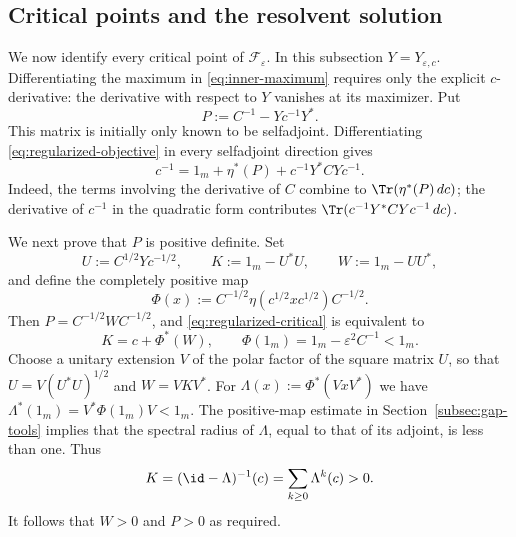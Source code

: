 \subsection{Critical points and the resolvent solution}
We now identify every critical point of $\mathcal F_\varepsilon$.
In this subsection $Y=Y_{\varepsilon,c}$.
Differentiating the maximum in \eqref{eq:inner-maximum} requires only the explicit $c$-derivative: the derivative with respect to $Y$ vanishes at its maximizer.
Put
\begin{equation}\label{eq:auxiliary-P}
 P:=C^{-1}-Yc^{-1}Y^*.
\end{equation}
This matrix is initially only known to be selfadjoint.
Differentiating \eqref{eq:regularized-objective} in every selfadjoint direction gives
\begin{equation}\label{eq:regularized-critical}
 c^{-1}=1_m+\eta^*(P)+c^{-1}Y^*CYc^{-1}.
\end{equation}
Indeed, the terms involving the derivative of $C$ combine to $\Tr(\eta^*(P)\,dc)$; the derivative of $c^{-1}$ in the quadratic form contributes $\Tr(c^{-1}Y^*CYc^{-1}\,dc)$.

We next prove that $P$ is positive definite.
Set
\[
 U:=C^{1/2}Yc^{-1/2},\qquad K:=1_m-U^*U,\qquad W:=1_m-UU^*,
\]
and define the completely positive map
\[
 \Phi(x):=C^{-1/2}\eta(c^{1/2}xc^{1/2})C^{-1/2}.
\]
Then $P=C^{-1/2}WC^{-1/2}$, and \eqref{eq:regularized-critical} is equivalent to
\begin{equation}\label{eq:sign-fixed-point}
 K=c+\Phi^*(W),\qquad
 \Phi(1_m)=1_m-\varepsilon^2C^{-1}<1_m.
\end{equation}
Choose a unitary extension $V$ of the polar factor of the square matrix $U$, so that $U=V(U^*U)^{1/2}$ and $W=VKV^*$.
For $\Lambda(x):=\Phi^*(VxV^*)$ we have $\Lambda^*(1_m)=V^*\Phi(1_m)V<1_m$.
The positive-map estimate in Section~\ref{subsec:gap-tools} implies that the spectral radius of $\Lambda$, equal to that of its adjoint, is less than one.
Thus
\[
 K=(\id-\Lambda)^{-1}(c)=\sum_{k\ge0}\Lambda^k(c)>0.
\]
It follows that $W>0$ and $P>0$ as required.

